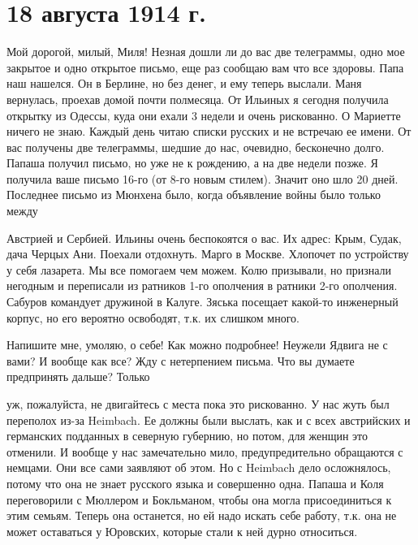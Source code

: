 \section{18 августа 1914 г.}


Мой дорогой, милый, Миля! Незная дошли ли до вас две телеграммы, одно мое
закрытое и одно открытое письмо, еще раз сообщаю вам что все здоровы. Папа наш
нашелся. Он в Берлине, но без денег, и ему теперь выслали. Маня вернулась,
проехав домой почти полмесяца. От Ильиных я сегодня получила открытку из
Одессы, куда они ехали 3 недели и очень рискованно. О Мариетте ничего не знаю.
Каждый день читаю списки русских и не встречаю ее имени. От вас получены две
телеграммы, шедшие до нас, очевидно, бесконечно долго. Папаша получил письмо,
но уже не к рождению, а на две недели позже. Я получила ваше письмо 16-го (от
8-го новым стилем). Значит оно шло 20 дней. Последнее письмо из Мюнхена было,
когда объявление войны было только между


\noindent
Австрией и Сербией. Ильины очень беспокоятся о вас. Их адрес: Крым, Судак, дача
Черцых Ани. Поехали отдохнуть. Марго в Москве. Хлопочет по устройству у себя
лазарета. Мы все помогаем чем можем. Колю призывали, но признали негодным и
переписали из ратников 1-го ополчения в ратники 2-го ополчения. Сабуров
командует дружиной в Калуге. Зяська посещает какой-то инженерный корпус, но его
вероятно освободят, т.к. их слишком много.

Напишите мне, умоляю, о себе! Как можно подробнее! Неужели Ядвига не с вами? И
вообще как все? Жду с нетерпением письма. Что вы думаете предпринять дальше?
Только


\noindent
уж, пожалуйста, не двигайтесь с места пока это рискованно. У нас жуть был
переполох из-за Heimbach. Ее должны были выслать, как и с всех австрийских и
германских подданных в северную губернию, но потом, для женщин это отменили. И
вообще у нас замечательно мило, предупредительно обращаются с немцами. Они все
сами заявляют об этом. Но с Heimbach дело осложнялось, потому что она не знает
русского языка и совершенно одна. Папаша и Коля переговорили с Мюллером и
Бокльманом, чтобы она могла присоединиться к этим семьям. Теперь она останется,
но ей надо искать себе работу, т.к. она не может оставаться у Юровских, которые
стали к ней дурно относиться.


